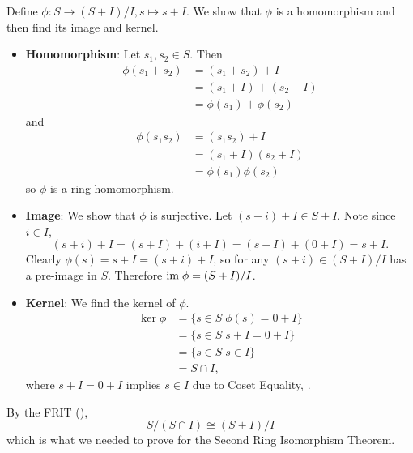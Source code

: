 \begin{questions}
\begin{partquestions}{\roman*}
        \item Define $\phi: S \to (S+I)/I, s \mapsto s+I$. We show that $\phi$ is a homomorphism and then find its image and kernel.
        \begin{itemize}
            \item \textbf{Homomorphism}: Let $s_1, s_2 \in S$. Then
            \begin{align*}
                \phi(s_1 + s_2) &= (s_1 + s_2) + I\\
                &= (s_1 + I) + (s_2 + I)\\
                &= \phi(s_1) + \phi(s_2)
            \end{align*}
            and
            \begin{align*}
                \phi(s_1s_2) &= (s_1s_2) + I\\
                &= (s_1+I)(s_2+I)\\
                &= \phi(s_1)\phi(s_2)
            \end{align*}
            so $\phi$ is a ring homomorphism.
    
            \item \textbf{Image}: We show that $\phi$ is surjective. Let $(s+i) + I \in S+I$. Note since $i \in I$,
            \[
                (s+i)+I = (s+I) + (i+I) = (s+I) + (0+I) = s+I.
            \]
            Clearly $\phi(s) = s+I = (s+i)+I$, so for any $(s+i)\in (S+I)/I$ has a pre-image in $S$. Therefore $\mathrm{im}\;\phi = (S+I)/I$.
    
            \item \textbf{Kernel}: We find the kernel of $\phi$.
            \begin{align*}
                \ker\phi &= \{s \in S \vert \phi(s) = 0 + I\}\\
                &= \{s \in S \vert s + I = 0 + I\}\\
                &= \{s \in S \vert s \in I\}\\
                &= S \cap I,
            \end{align*}
            where $s + I = 0 + I$ implies $s \in I$ due to Coset Equality, .
        \end{itemize}
    
        By the FRIT (),
        \[
            S/(S\cap I) \cong (S+I)/I
        \]
        which is what we needed to prove for the Second Ring Isomorphism Theorem.
    \end{partquestions}


\end{questions}
